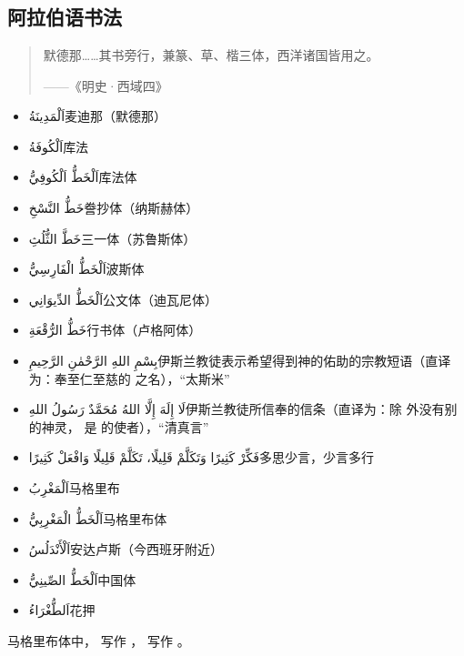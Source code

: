 \chapter{}

\section{ 阿拉伯语书法}

\begin{quote}
    默德那……其书旁行，兼篆、草、楷三体，西洋诸国皆用之。
    
    \hfill ——《明史·西域四》
\end{quote}

\begin{itemize}
    \item \ac{اَلْمَدِينَةُ}{麦迪那（默德那）}
    \item \ac{اَلْكُوفَةُ}{库法} 
    \item \ac{اَلْخَطُّ اَلْكُوفِيُّ}{库法体}
    \item \ac{خَطُّ النَّسْخِ}{誊抄体（纳斯赫体）}
    \item \ac{خَطَّ الثُّلُثِ}{三一体（苏鲁斯体）}
    \item \ac{اَلْخَطُّ الْفَارِسِيُّ}{波斯体}
    \item \ac{اَلْخَطُّ الدِّيوَانِي}{公文体（迪瓦尼体）}
    \item \ac{خَطُّ الرُّقْعَةِ}{行书体（卢格阿体）}
    \item \ac{بِسْمِ اللهِ الرَّحْمٰنِ الرَّحِيمِ}{伊斯兰教徒表示希望得到神的佑助的宗教短语（直译为：奉至仁至慈的  之名），``太斯米''}
    \item \ac{لَا إِلَهَ إِلَّا اللهُ مُحَمَّدٌ رَسُولُ اللهِ}{伊斯兰教徒所信奉的信条（直译为：除  外没有别的神灵， 是  的使者），``清真言''} 
    \item \ac{فَكِّرْ كَثِيرًا وَتَكَلَّمْ قَلِيلًا، تَكَلَّمْ قَلِيلًا وَافْعَلْ كَثِيرًا}{多思少言，少言多行}
    \item \ac{اَلْمَغْرِبُ}{马格里布}
    \item \ac{اَلْخَطُّ الْمَغْرِبِيُّ}{马格里布体}
    \item \ac{اَلْأَنْدَلُسُ}{安达卢斯（今西班牙附近）}
    \item \ac{اَلْخَطُّ الصِّينِيُّ}{中国体}
    \item \ac{اَلطُّغْرَاءُ}{花押}
\end{itemize}

\begin{attention}
    马格里布体中， 写作 ， 写作 。
\end{attention}

